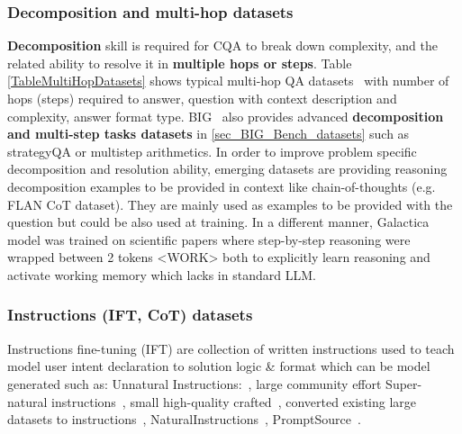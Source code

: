 \documentclass[acmsmall]{acmart}
\begin{document}
\subsubsection{Decomposition and multi-hop datasets}
\textbf{Decomposition} skill is required for CQA to break down complexity, and the related ability to resolve it in \textbf{multiple hops or steps}. Table \ref{TableMultiHopDatasets} shows typical multi-hop QA datasets~\citep{maviSurveyMultihopQuestion2022} with number of hops (steps) required to answer, question with context description and complexity, answer format type. BIG~\citep{bigetal.ImitationGameQuantifying2022} also provides advanced \textbf{decomposition and multi-step tasks datasets} in \ref{sec_BIG_Bench_datasets} such as strategyQA or multistep arithmetics.
In order to improve problem specific decomposition and resolution ability, emerging datasets are providing reasoning decomposition examples to be provided in context like chain-of-thoughts (e.g. FLAN CoT dataset\citep{chungScalingInstructionFinetunedLanguage2022}). They are mainly used as examples to be provided with the question but could be also used at training. In a different manner, Galactica model was trained on scientific papers where step-by-step reasoning were wrapped between 2 tokens <WORK>\citep{taylorGalacticaLargeLanguage2022} both to explicitly learn reasoning and activate working memory which lacks in standard LLM.

\subsubsection{Instructions (IFT, CoT) datasets}
Instructions fine-tuning (IFT) are collection of written instructions used to teach model user intent declaration to solution logic \& format which can be model generated such as: Unnatural Instructions:~\citep{honovichUnnaturalInstructionsTuning2022}, large community effort Super-natural instructions~\citep{wangSuperNaturalInstructionsGeneralizationDeclarative2022}, small high-quality crafted~\citep{wangSelfInstructAligningLanguage2022}, converted existing large datasets to instructions~\citep{iyerOPTIMLScalingLanguage2023, weiFinetunedLanguageModels2022}, NaturalInstructions~\citep{mishraCrossTaskGeneralizationNatural2022}, PromptSource~\citep{sanhMultitaskPromptedTraining2022}.
\end{document}
